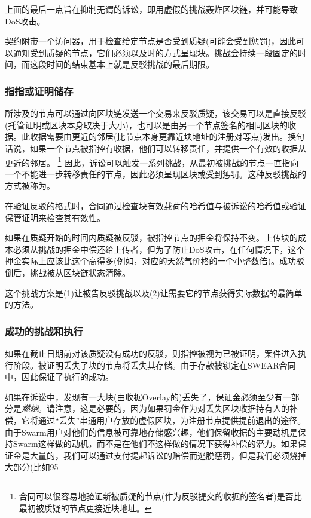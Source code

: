 上面的最后一点旨在抑制无谓的诉讼，即用虚假的挑战轰炸区块链，并可能导致DoS攻击。

契约附带一个访问器，用于检查给定节点是否受到质疑(可能会受到惩罚)，因此可以通知受到质疑的节点，它们必须以及时的方式呈现块。挑战会持续一段固定的时间，而这段时间的结束基本上就是反驳挑战的最后期限。 


\subsubsection{指指或证明储存}


所涉及的节点可以通过向区块链发送一个交易来反驳质疑，该交易可以是直接反驳(托管证明或区块本身取决于大小)，也可以是由另一个节点签名的相同区块的收据。此收据需要由更近的邻居(比节点本身更靠近块地址的注册对等点)发出。换句话说，如果一个节点被指控有收据，他们可以转移责任，并提供一个有效的收据从更近的邻居。%
%
\footnote{合同可以很容易地验证新被质疑的节点(作为反驳提交的收据的签名者)是否比最初被质疑的节点更接近块地址。}
%
因此，诉讼可以触发一系列挑战，从最初被挑战的节点一直指向一个不能进一步转移责任的节点，因此必须呈现区块或受到惩罚。这种反驳挑战的方式被称为。 

在验证反驳的格式时，合同通过检查块有效载荷的哈希值与被诉讼的哈希值或验证保管证明来检查其有效性。 

如果在质疑开始的时间内质疑被反驳，被指控节点的押金将保持不变。上传块的成本必须从挑战的押金中偿还给上传者，但为了防止DoS攻击，在任何情况下，这个押金实际上应该比这个高得多(例如，对应的天然气价格的一个小整数倍)。成功驳倒后，挑战被从区块链状态清除。

这个挑战方案是(1)让被告反驳挑战以及(2)让需要它的节点获得实际数据的最简单的方法。

\subsubsection{成功的挑战和执行}

如果在截止日期前对该质疑没有成功的反驳，则指控被视为已被证明，案件进入执行阶段。被证明丢失了块的节点将丢失其存储。由于存款被锁定在SWEAR合同中，因此保证了执行的成功。

如果在诉讼中，发现有一大块(由收据Overlay的)丢失了，保证金必须至少有一部分是\emph{燃烧}。请注意，这是必要的，因为如果罚金作为对丢失区块收据持有人的补偿，它将通过“丢失”串通用户存放的虚假区块，为注册节点提供提前退出的途径。由于Swarm用户对他们的信息被可靠地存储感兴趣，他们保留收据的主要动机是保持Swarm这样做的动机，而不是在他们不这样做的情况下获得补偿的潜力。如果保证金是大量的，我们可以通过支付提起诉讼的赔偿而逃脱惩罚，但是我们必须烧掉大部分(比如95%

